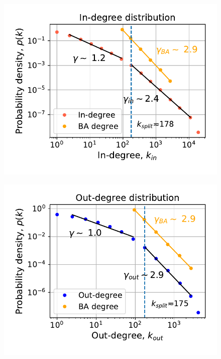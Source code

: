 \documentclass[12pt, twoside]{report}
\begin{document}
\begin{minipage}[b]{0.5\textwidth}
   \centering
    \begin{figure}[H]
      \includegraphics[width=\textwidth]{../../scripts/network_analysis/imgs/in_degree_distribution.pdf}            
          \caption{}
        \label{fig:in_degree}
\end{figure}
\end{minipage}
\begin{minipage}[b]{0.5\textwidth}
  \begin{figure}[H]
  \centering
  \includegraphics[width=\textwidth]{../../scripts/network_analysis/imgs/out_degree_distribution.pdf}            
        \caption{}
\label{fig:out_degree}
\end{figure}
\end{minipage}
\end{document}
